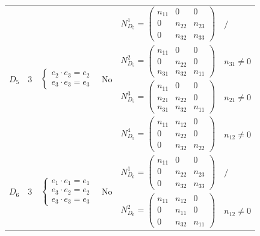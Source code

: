 \documentclass[12pt, reqno]{amsart}
\theoremstyle{plain}
\begin{document}
\begin{table}[H]
\begin{tabular}{|c|c|l|c|l|l|}
    \hline
    \multirow{4}{*}{$D_5$} & \multirow{4}{*}{3} & \multirow{4}{*}{$\begin{cases} e_2 \cdot e_3 = e_2 \\ e_3 \cdot e_3 = e_3 \end{cases}$} & \multirow{4}{*}{No} & 
    $N_{D_5}^1 = \begin{pmatrix} n_{11} & 0 & 0 \\ 0 & n_{22} & n_{23} \\ 0 & n_{32} & n_{33} \end{pmatrix}$ & $/$ \\
    & & & & $N_{D_5}^2 = \begin{pmatrix} n_{11} & 0 & 0 \\ 0 & n_{22} & 0 \\ n_{31} & n_{32} & n_{11} \end{pmatrix}$ & $n_{31} \neq 0$ \\
    & & & & $N_{D_5}^3 = \begin{pmatrix} n_{11} & 0 & 0 \\ n_{21} & n_{22} & 0 \\ n_{31} & n_{32} & n_{11} \end{pmatrix}$ & $n_{21} \neq 0$ \\
    & & & & $N_{D_5}^4 = \begin{pmatrix} n_{11} & n_{12} & 0 \\ 0 & n_{22} & 0 \\ 0 & n_{32} & n_{22} \end{pmatrix}$ & $n_{12} \neq 0$ \\
    \hline
    \multirow{6}{*}{$D_6$} & \multirow{6}{*}{3} & \multirow{6}{*}{$\begin{cases} e_1 \cdot e_1 = e_1 \\ e_3 \cdot e_2 = e_2 \\ e_3 \cdot e_3 = e_3 \end{cases}$} & \multirow{6}{*}{No} & 
    $N_{D_6}^1 = \begin{pmatrix} n_{11} & 0 & 0 \\ 0 & n_{22} & n_{23} \\ 0 & n_{32} & n_{33} \end{pmatrix}$ & $/$ \\
    & & & & $N_{D_6}^2 = \begin{pmatrix} n_{11} & n_{12} & 0 \\ 0 & n_{11} & 0 \\ 0 & n_{32} & n_{11} \end{pmatrix}$ & $n_{12} \neq 0$ \\

\end{tabular}
\end{table}
\end{document}
